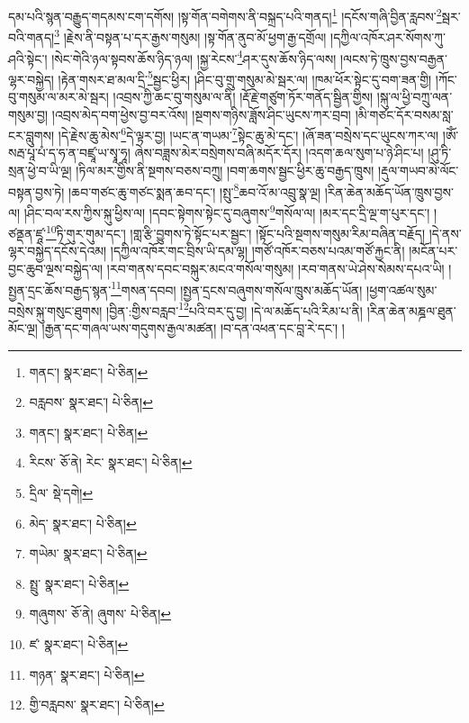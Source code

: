 དམ་པའི་སྙན་བརྒྱུད་གདམས་ངག་དགོས། །སྟ་གོན་བགེགས་ནི་བསྐྲད་པའི་གནད།\footnote{གནང་།  སྣར་ཐང་།  པེ་ཅིན། } །དངོས་གཞི་བྱིན་རླབས་\footnote{བརླབས་  སྣར་ཐང་།  པེ་ཅིན། }སྦར་བའི་གནད།\footnote{གནང་།  སྣར་ཐང་།  པེ་ཅིན། } །རྗེས་ནི་བསྟན་པ་དར་རྒྱས་གསུམ། །སྟ་གོན་ནུབ་མོ་ཕྱག་རྒྱ་དགྲོལ། །དཀྱིལ་འཁོར་ཤར་སོགས་ཀུ་ཤའི་སྟེང་། །སེང་གེའི་ཉལ་སྟབས་ཆོས་ཉིད་ཉལ། །སྐྱ་རེངས་\footnote{རིངས་  ཅོ་ནེ། རེང་  སྣར་ཐང་།  པེ་ཅིན། }ཤར་དུས་ཆོས་ཉིད་ལས། །ལངས་ཏེ་ཁྲུས་བྱས་བརྒྱན་ལྷར་བསྐྱེད། །རྟེན་གསར་ཐ་མལ་དྲི་\footnote{དྲིལ་  སྡེ་དགེ། }སྦྱང་ཕྱིར། །ཤིང་བུ་གྲུ་གསུམ་མེ་སྦར་ལ། །ཁམ་ཕོར་སྟེང་དུ་བག་ཟན་གྱི། །ཀོང་བུ་གསུམ་ལ་མར་མེ་སྦར། །འབྲས་ཀྱི་ཆང་བུ་གསུམ་ལ་ནི། །རྡོ་རྗེ་གཙུག་ཏོར་གནོད་སྦྱིན་གྱིས། །སྐུ་ལ་ཕྱི་བཀྲུ་ལན་གསུམ་བྱ། །འབྲས་མེད་བག་ཕྱེས་བྱ་བར་འོས། །སྔགས་གཉིས་ཟློས་ཤིང་ཡུངས་ཀར་བྲབ། །མི་གཙང་དོར་བསམ་སླ་ངར་བླུགས། །དེ་རྗེས་ཆུ་མེས་\footnote{མེད་  སྣར་ཐང་།  པེ་ཅིན། }དེ་ལྟར་བྱ། །ཡང་ན་གཡམ་\footnote{གཡེམ་  སྣར་ཐང་།  པེ་ཅིན། }སྟེང་ཆུ་མེ་དང་། །ཞོ་ཟན་བསྲེས་དང་ཡུངས་ཀར་ལ། །ཨོཾ་སརྦ་པཱ་པཾ་ད་ཧ་ན་བཛྲཱ་ཡ་སྭཱ་ཧཱ། ཞེས་བཟླས་མེར་བསྲེགས་བཞི་མདོར་དོར། །འདག་ཆལ་སུག་པ་ཉེ་ཤིང་པ། །ཤུ་ཏི་སྲན་ཕྱེ་བ་ཡི་ལྔ། །ཏིལ་མར་གྱིས་ནི་སྔགས་བཅས་བཀྲུ། །བག་ཆགས་སྦྱང་ཕྱིར་ཆུ་བརྒྱད་ཁྲུས། །རྡུལ་གཡབ་མེ་ལོང་བསྟན་བྱས་ཏེ། །ཆབ་གཙང་ཆུ་གཙང་སྨན་ཆབ་དང་། །སྤུ་\footnote{སྤྲུ་  སྣར་ཐང་།  པེ་ཅིན། }ཆབ་འོ་མ་འབྲུ་སྣ་ལྔ། །རིན་ཆེན་མཆོད་ཡོན་ཁྲུས་བྱས་ལ། །ཤིང་བལ་རས་ཀྱིས་སྐུ་ཕྱིས་ལ། །དབང་སྟེགས་སྟེང་དུ་བཞུགས་\footnote{གཞུགས་  ཅོ་ནེ། ཞུགས་  པེ་ཅིན། }གསོལ་ལ། །མར་དང་དྲི་ལྔ་ག་པུར་དང་། །ཙནྡན་ཛཱ་\footnote{ཛ་  སྣར་ཐང་།  པེ་ཅིན། }ཏི་གུར་གུམ་དང་། །གླ་རྩི་བྱུགས་ཏེ་སྟོང་པར་སྦྱང་། །སྟོང་པའི་སྔགས་གསུམ་རིམ་བཞིན་བརྗོད། །དེ་ནས་ལྷར་བསྐྱེད་དངོས་དེའམ། །དཀྱིལ་འཁོར་གང་བྲིས་ཡི་དམ་ལྷ། །གཙོ་འཁོར་བཅས་པའམ་གཙོ་རྐྱང་ནི། །མངོན་པར་བྱང་ཆུབ་ལྔས་བསྐྱེད་ལ། །རབ་གནས་དབང་བསྐུར་མངའ་གསོལ་གསུམ། །རབ་གནས་ཡེ་ཤེས་སེམས་དཔའ་ཡི། །སྤྱན་དྲང་ཆོས་བརྒྱད་སྙན་\footnote{གཉན་  སྣར་ཐང་།  པེ་ཅིན། }གསན་དབབ། །སྤྱན་དྲངས་བཞུགས་གསོལ་ཁྲུས་མཆོད་ཡོན། །ཕྱག་འཚལ་སུམ་བསྲེས་སྐུ་གསུང་ཐུགས། །བྱིན་:གྱིས་བརླབ་\footnote{གྱི་བརླབས་  སྣར་ཐང་།  པེ་ཅིན། }པའི་བར་དུ་བྱ། །དེ་ལ་མཆོད་པའི་རིམ་པ་ནི། །རིན་ཆེན་མཎྜལ་ཐུན་མོང་ལྔ། །རྒྱན་དང་གཞལ་ཡས་གདུགས་རྒྱལ་མཚན། །བ་དན་འཕན་དང་བླ་རེ་དང་། །
